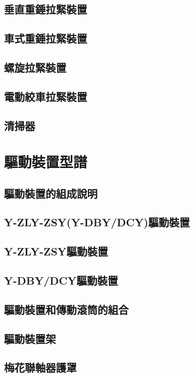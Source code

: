 \documentclass[UTF8]{ctexart}
\begin{document}
\subsection{垂直重錘拉緊裝置}
\subsection{車式重錘拉緊裝置}
\subsection{螺旋拉緊裝置}
\subsection{電動絞車拉緊裝置}
\subsection{清掃器}
 




\newpage
\section{驅動裝置型譜}

\subsection{驅動裝置的組成說明}
\subsection{Y-ZLY-ZSY(Y-DBY/DCY)驅動裝置}
\subsection{Y-ZLY-ZSY驅動裝置}
\subsection{Y-DBY/DCY驅動裝置}
\subsection{驅動裝置和傳動滾筒的組合}
\subsection{驅動裝置架}
\subsection{梅花聯軸器護罩}
\end{document}
